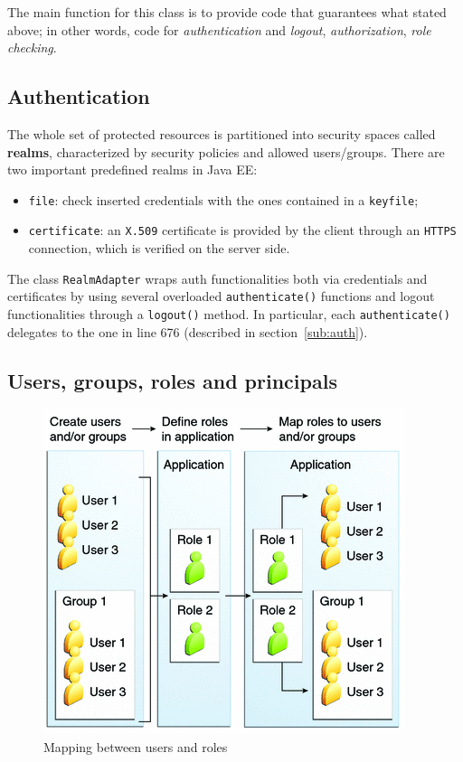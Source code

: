\documentclass[a4paper, 11pt]{article}
\newcommand{\code}[1]{\texttt{#1}}
\begin{document}
The main function for this class is to provide code that guarantees what stated above; in other words, code for \emph{authentication} and \emph{logout}, \emph{authorization}, \emph{role checking}.

\subsection{Authentication}
The whole set of protected resources is partitioned into security spaces called \textbf{realms}, characterized by security policies and allowed users/groups. There are two important predefined realms in Java EE:
\begin{itemize}
    \item \code{file}: check inserted credentials with the ones contained in a \code{keyfile};
    \item \code{certificate}: an \code{X.509} certificate is provided by the client through an \code{HTTPS} connection, which is verified on the server side.
\end{itemize}

The class \code{RealmAdapter} wraps auth functionalities both via credentials and certificates by using several overloaded \code{authenticate()} functions and logout functionalities through a \code{logout()} method. In particular, each \code{authenticate()} delegates to the one in line 676 (described in section~\ref{sub:auth}).

\subsection{Users, groups, roles and principals}
\begin{figure}[tb]
    \centering
    \includegraphics[]{img/security.png}
    \caption{Mapping between users and roles}
    \label{fig:security}
\end{figure}
\end{document}
